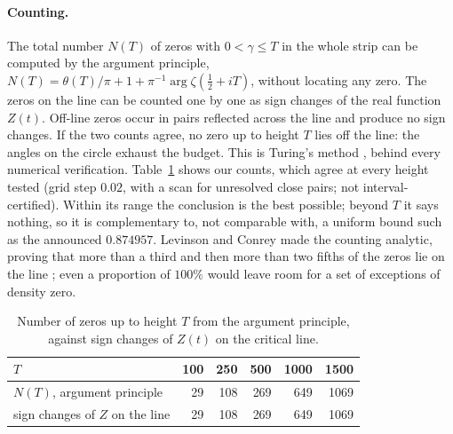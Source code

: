 \documentclass[11pt,a4paper]{article}
\theoremstyle{definition}\newtheorem{definition}[proposition]{Definition}
\theoremstyle{remark}\newtheorem{remark}[proposition]{Remark}
\begin{document}
\paragraph{Counting.} The total number $N(T)$ of zeros with $0<\gamma\le T$ in the whole strip can be computed by the argument principle, $N(T)=\theta(T)/\pi+1+\pi^{-1}\arg\zeta(\tfrac12+iT)$, without locating any zero. The zeros on the line can be counted one by one as sign changes of the real function $Z(t)$. Off-line zeros occur in pairs reflected across the line and produce no sign changes. If the two counts agree, no zero up to height $T$ lies off the line: the angles on the circle exhaust the budget. This is Turing's method \cite{Turing1953}, behind every numerical verification. Table~\ref{tab:count} shows our counts, which agree at every height tested (grid step $0.02$, with a scan for unresolved close pairs; not interval-certified). Within its range the conclusion is the best possible; beyond $T$ it says nothing, so it is complementary to, not comparable with, a uniform bound such as the announced $0.874957$. Levinson and Conrey made the counting analytic, proving that more than a third and then more than two fifths of the zeros lie on the line \cite{Levinson1974,Conrey1989}; even a proportion of $100\%$ would leave room for a set of exceptions of density zero.

\begin{table}[ht]\centering\small
\caption{Number of zeros up to height $T$ from the argument principle, against sign changes of $Z(t)$ on the critical line.}\label{tab:count}
\begin{tabular}{lrrrrr}
\toprule
$T$ & 100 & 250 & 500 & 1000 & 1500\\
\midrule
$N(T)$, argument principle & 29 & 108 & 269 & 649 & 1069\\
sign changes of $Z$ on the line & 29 & 108 & 269 & 649 & 1069\\
\bottomrule
\end{tabular}
\end{table}
\end{document}
